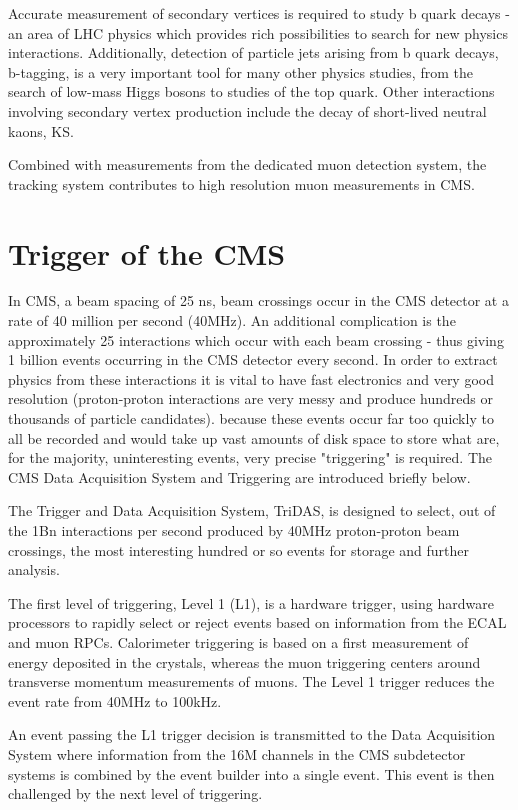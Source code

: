 Accurate measurement of secondary vertices is required to study b quark decays - an area of LHC physics which provides rich possibilities to search for new physics interactions. 
Additionally, detection of particle jets arising from b quark decays, b-tagging, is a very important tool for many other physics studies, from the search of low-mass Higgs bosons to studies of the top quark. 
Other interactions involving secondary vertex production include the decay of short-lived neutral kaons, KS.

Combined with measurements from the dedicated muon detection system, the tracking system contributes to high resolution muon measurements in CMS.


\section{Trigger of the CMS}
In CMS, a beam spacing of 25 ns, beam crossings occur in the CMS detector at a rate of 40 million per second (40MHz). 
An additional complication is the approximately 25 interactions which occur with each beam crossing - thus giving 1 billion events occurring in the CMS detector every second. 
In order to extract physics from these interactions it is vital to have fast electronics and very good resolution (proton-proton interactions are very messy and produce hundreds or thousands of particle candidates).
because these events occur far too quickly to all be recorded and would take up vast amounts of disk space to store what are, for the majority, uninteresting events, very precise "triggering" is required. 
The CMS Data Acquisition System and Triggering are introduced briefly below.


The Trigger and Data Acquisition System, TriDAS, is designed to select, out of the 1Bn interactions per second produced by 40MHz proton-proton beam crossings, the most interesting hundred or so events for storage and further analysis.

The first level of triggering, Level 1 (L1), is a hardware trigger, using hardware processors to rapidly select or reject events based on information from the ECAL and muon RPCs. 
Calorimeter triggering is based on a first measurement of energy deposited in the crystals, whereas the muon triggering centers around transverse momentum measurements of muons. 
The Level 1 trigger reduces the event rate from 40MHz to 100kHz.

An event passing the L1 trigger decision is transmitted to the Data Acquisition System where information from the 16M channels in the CMS subdetector systems is combined by the event builder into a single event. 
This event is then challenged by the next level of triggering.

